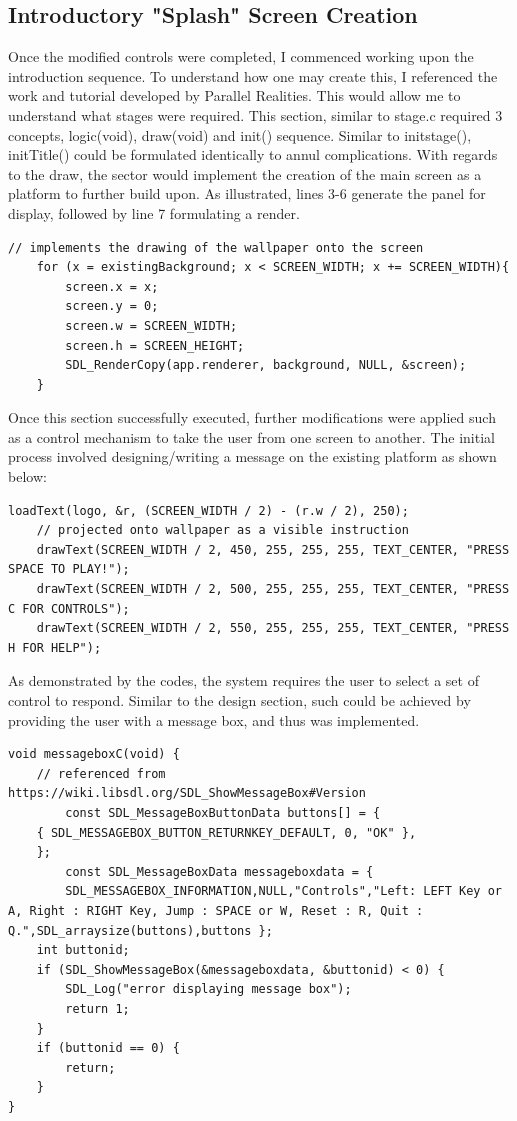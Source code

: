 \documentclass{article}
\begin{document}
\subsection{Introductory "Splash" Screen Creation}
Once the modified controls were completed, I commenced working upon the introduction sequence. To understand how one may create this, I referenced the work and tutorial developed by Parallel Realities. This would allow me to understand what stages were required. This section, similar to stage.c required 3 concepts, logic(void), draw(void) and init() sequence. Similar to initstage(), initTitle() could be formulated identically to annul complications. With regards to the draw, the sector would implement the creation of the main screen as a platform to further build upon. As illustrated, lines 3-6 generate the panel for display, followed by line 7 formulating a render.
\begin{lstlisting}[caption={homescreen.c background setup},captionpos=b]
// implements the drawing of the wallpaper onto the screen
	for (x = existingBackground; x < SCREEN_WIDTH; x += SCREEN_WIDTH){
		screen.x = x;
		screen.y = 0;
		screen.w = SCREEN_WIDTH;
		screen.h = SCREEN_HEIGHT;
		SDL_RenderCopy(app.renderer, background, NULL, &screen);
	}
\end{lstlisting}
Once this section successfully executed, further modifications were applied such as a control mechanism to take the user from one screen to another. The initial process involved designing/writing a message on the existing platform as shown below:
\begin{lstlisting}[caption={homescreen.c command prompts},captionpos=b]
loadText(logo, &r, (SCREEN_WIDTH / 2) - (r.w / 2), 250);
	// projected onto wallpaper as a visible instruction
	drawText(SCREEN_WIDTH / 2, 450, 255, 255, 255, TEXT_CENTER, "PRESS SPACE TO PLAY!");
	drawText(SCREEN_WIDTH / 2, 500, 255, 255, 255, TEXT_CENTER, "PRESS C FOR CONTROLS");
	drawText(SCREEN_WIDTH / 2, 550, 255, 255, 255, TEXT_CENTER, "PRESS H FOR HELP");
\end{lstlisting}
As demonstrated by the codes, the system requires the user to select a set of control to respond. Similar to the design section, such could be achieved by providing the user with a message box, and thus was implemented.
\begin{lstlisting}[caption={homescreen.c messsage boxes},captionpos=b]
void messageboxC(void) {
	// referenced from https://wiki.libsdl.org/SDL_ShowMessageBox#Version
		const SDL_MessageBoxButtonData buttons[] = {
	{ SDL_MESSAGEBOX_BUTTON_RETURNKEY_DEFAULT, 0, "OK" },
	};
		const SDL_MessageBoxData messageboxdata = {
		SDL_MESSAGEBOX_INFORMATION,NULL,"Controls","Left: LEFT Key or A, Right : RIGHT Key, Jump : SPACE or W, Reset : R, Quit : Q.",SDL_arraysize(buttons),buttons };
	int buttonid;
	if (SDL_ShowMessageBox(&messageboxdata, &buttonid) < 0) {
		SDL_Log("error displaying message box");
		return 1;
	}
	if (buttonid == 0) {
		return;
	}
}
\end{lstlisting}
\end{document}
